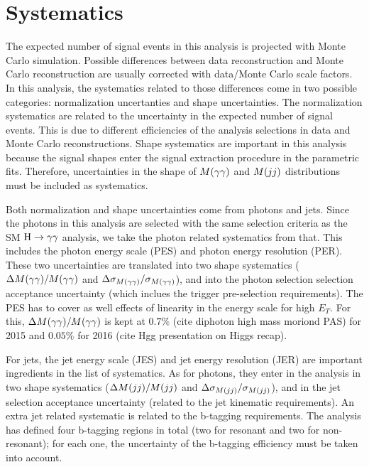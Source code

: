 \section{Systematics}
\label{sec:systematics}

The expected number of signal events in this analysis is projected with Monte Carlo simulation.
Possible differences between data reconstruction and Monte Carlo reconstruction are usually corrected with data/Monte Carlo scale factors.
In this analysis, the systematics related to those differences come in two possible categories: normalization uncertanties and shape uncertainties.
The normalization systematics are related to the uncertainty in the expected number of signal events. This is due to different efficiencies of the analysis selections in data and Monte Carlo reconstructions.
Shape systematics are important in this analysis because the signal shapes enter the signal extraction procedure in the parametric fits. Therefore, uncertainties in the shape of $M(\gamma\gamma)$ and $M(jj)$ distributions must be included as systematics.

Both normalization and shape uncertainties come from photons and jets.
Since the photons in this analysis are selected with the same selection criteria as the SM $\mathrm{H}\to\gamma\gamma$ analysis, we take the photon related systematics from that.
This includes the photon energy scale (PES) and photon energy resolution (PER).
These two uncertainties are translated into two shape systematics ($\Delta M(\gamma\gamma)/M(\gamma\gamma)$ and $\Delta \sigma_{M(\gamma\gamma)}/\sigma_{M(\gamma\gamma)}$), and into the photon selection selection acceptance uncertainty (which inclues the trigger pre-selection requirements).
The PES has to cover as well effects of linearity in the energy scale for high $E_{T}$. For this, $\Delta M(\gamma\gamma)/M(\gamma\gamma)$ is kept at $0.7\%$ (cite diphoton high mass moriond PAS) for 2015 and  $0.05\%$ for 2016 (cite Hgg presentation on Higgs recap).

For jets, the jet energy scale (JES) and jet energy resolution (JER) are important ingredients in the list of systematics.
As for photons, they enter in the analysis in two shape systematics ($\Delta M(jj)/M(jj)$ and $\Delta \sigma_{M(jj)}/\sigma_{M(jj)}$), and in the jet selection acceptance uncertainty (related to the jet kinematic requirements).
An extra jet related systematic is related to the b-tagging requirements. The analysis has defined four b-tagging regions in total (two for resonant and two for non-resonant); for each one, the uncertainty of the b-tagging efficiency must be taken into account.

